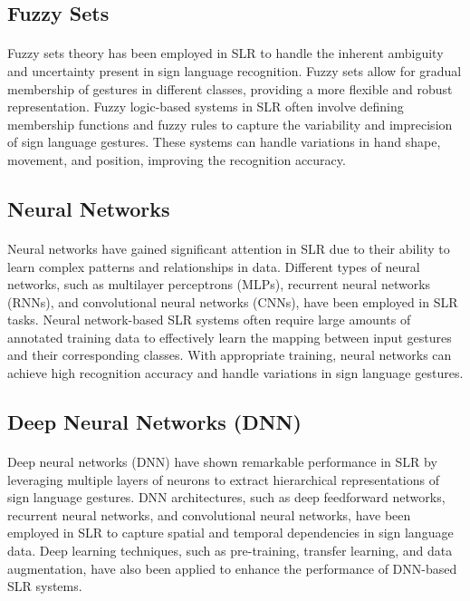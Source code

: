 \subsection{Fuzzy Sets}
\paragraph{}
Fuzzy sets theory has been employed in SLR to handle the inherent ambiguity and uncertainty present in sign language recognition. Fuzzy sets allow for gradual membership of gestures in different classes, providing a more flexible and robust representation. Fuzzy logic-based systems in SLR often involve defining membership functions and fuzzy rules to capture the variability and imprecision of sign language gestures. These systems can handle variations in hand shape, movement, and position, improving the recognition accuracy.

\subsection{Neural Networks}
\paragraph{}
Neural networks have gained significant attention in SLR due to their ability to learn complex patterns and relationships in data. Different types of neural networks, such as multilayer perceptrons (MLPs), recurrent neural networks (RNNs), and convolutional neural networks (CNNs), have been employed in SLR tasks. Neural network-based SLR systems often require large amounts of annotated training data to effectively learn the mapping between input gestures and their corresponding classes. With appropriate training, neural networks can achieve high recognition accuracy and handle variations in sign language gestures.

\subsection{Deep Neural Networks (DNN)}
\paragraph{}
Deep neural networks (DNN) have shown remarkable performance in SLR by leveraging multiple layers of neurons to extract hierarchical representations of sign language gestures. DNN architectures, such as deep feedforward networks, recurrent neural networks, and convolutional neural networks, have been employed in SLR to capture spatial and temporal dependencies in sign language data. Deep learning techniques, such as pre-training, transfer learning, and data augmentation, have also been applied to enhance the performance of DNN-based SLR systems.
